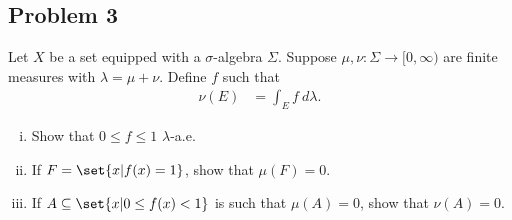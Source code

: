 \documentclass[10pt]{mypackage}
\begin{document}
\subsection{Problem 3}%
\begin{problem}
  Let $X$ be a set equipped with a $\sigma$-algebra $\Sigma$. Suppose $\mu,\nu\colon \Sigma\rightarrow [0,\infty)$ are finite measures with $\lambda = \mu + \nu$. Define $f$ such that
  \begin{align*}
    \nu\left( E \right) &= \int_{E}^{} f\:d\lambda.
  \end{align*}
  \begin{enumerate}[(i)]
    \item Show that $0 \leq f \leq 1$ $\lambda$-a.e.
    \item If $F = \set{x | f(x) = 1}$, show that $\mu(F) = 0$.
    \item If $A\subseteq \set{x | 0 \leq f(x) < 1}$ is such that $\mu(A) = 0$, show that $\nu(A) = 0$.
  \end{enumerate}
\end{problem}
\end{document}
